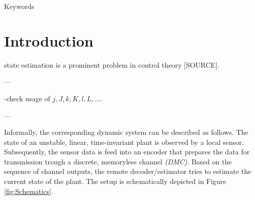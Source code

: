 \documentclass[conference]{IEEEtran}
\newcommand{\sdummy}{{\color{red}[SOURCE]}}
\begin{document}
\begin{IEEEkeywords}
	\color{red} Keywords
\end{IEEEkeywords}

\section{Introduction}\label{sec:Introduction}
	 state estimation is a prominent problem in control theory \sdummy.  

---

	-check usage of \(j,J,k,K,l,L,\ldots\).

---

	Informally, the corresponding dynamic system can be described as follows. The state of an unstable, linear, time-invariant plant is observed by a local sensor. 
	Subsequently, the sensor data is feed into an encoder that prepares the data for transmission trough a discrete, memoryless channel \emph{(DMC)}. 
	Based on the sequence of channel outputs, the remote decoder/estimator tries to estimate the current state of the plant. The setup is schematically depicted in Figure \ref{fig:Schematics}.
\end{document}
